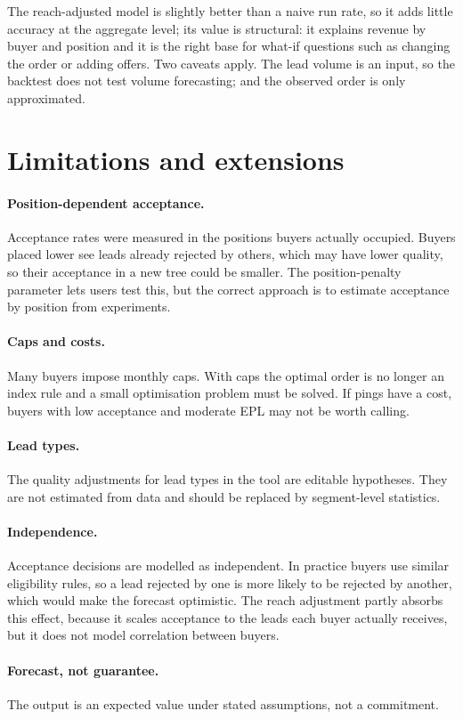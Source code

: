 \documentclass[10pt,a4paper]{article}
\begin{document}
The reach-adjusted model is slightly better than a naive run rate, so it adds little accuracy at the aggregate level; its value is structural: it explains revenue by buyer and position and it is the right base for what-if questions such as changing the order or adding offers. Two caveats apply. The lead volume is an input, so the backtest does not test volume forecasting; and the observed order is only approximated.

\section{Limitations and extensions}\label{sec:limits}
\paragraph{Position-dependent acceptance.} Acceptance rates were measured in the positions buyers actually occupied. Buyers placed lower see leads already rejected by others, which may have lower quality, so their acceptance in a new tree could be smaller. The position-penalty parameter lets users test this, but the correct approach is to estimate acceptance by position from experiments.
\paragraph{Caps and costs.} Many buyers impose monthly caps. With caps the optimal order is no longer an index rule and a small optimisation problem must be solved. If pings have a cost, buyers with low acceptance and moderate EPL may not be worth calling.
\paragraph{Lead types.} The quality adjustments for lead types in the tool are editable hypotheses. They are not estimated from data and should be replaced by segment-level statistics.
\paragraph{Independence.} Acceptance decisions are modelled as independent. In practice buyers use similar eligibility rules, so a lead rejected by one is more likely to be rejected by another, which would make the forecast optimistic. The reach adjustment partly absorbs this effect, because it scales acceptance to the leads each buyer actually receives, but it does not model correlation between buyers.
\paragraph{Forecast, not guarantee.} The output is an expected value under stated assumptions, not a commitment.
\end{document}
